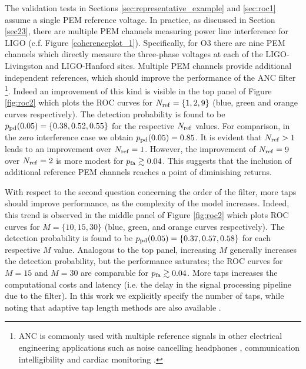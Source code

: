 \documentclass[pra,superscriptaddress,reprint,amsmath,amssymb,nofootinbib]{revtex4-2}
\begin{document}
The validation tests in Sections \ref{sec:representative_example} and \ref{sec:roc1} assume a single PEM reference voltage. In practice, as discussed in Section \ref{sec23}, there are multiple PEM channels measuring power line interference for LIGO (c.f. Figure \ref{coherenceplot_1}). Specifically, for O3 there are nine PEM channels which directly measure the three-phase voltages at each of the LIGO-Livingston and LIGO-Hanford sites. Multiple PEM channels provide additional independent references, which should improve the performance of the ANC filter \footnote{ANC is commonly used with multiple reference signals in other electrical engineering applications such as noise cancelling headphones \citep{10.1121/1.5109394}, communication intelligibility \citep{KUO1996669,doi:10.1177/1084713812456906} and cardiac monitoring \citep{7755741}.}. Indeed an improvement of this kind is visible in the top panel of Figure \ref{fig:roc2} which plots the ROC curves for $N_{\rm ref} = \{ 1,2,9 \}$ (blue, green and orange curves respectively). The detection probability is found to be $p_{\rm pd} (0.05) = \{ 0.38,0.52,0.55 \}$ for the respective $N_{\rm ref}$ values. For comparison, in the zero interference case we obtain $p_{\rm pd}(0.05) = 0.85$. It is evident that $N_{\rm ref} > 1$ leads to an improvement over $N_{\rm ref} = 1$. However, the improvement of $N_{\rm ref} =9$ over $N_{\rm ref} =2$ is more modest for $p_{\rm fa} \gtrsim 0.04$. This suggests that the inclusion of additional reference PEM channels reaches a point of diminishing returns. \newline 


With respect to the second question concerning the order of the filter, more taps should improve performance, as the complexity of the model increases. Indeed, this trend is observed in the middle panel of Figure \ref{fig:roc2}  which plots ROC curves for $M = \{10,15,30\}$ (blue, green, and orange curves respectively). The detection probability is found to be $p_{\rm pd} (0.05) = \{0.37, 0.57, 0.58\}$ for each respective $M$ value. Analogous to the top panel, increasing $M$ generally increases the detection probability, but the performance saturates; the ROC curves for $M=15$ and $M=30$ are comparable for $p_{\rm fa} \gtrsim 0.04$. More taps increases the computational costs and latency (i.e. the delay in the signal processing pipeline due to the filter). In this work we explicitly specify the number of taps, while noting that adaptive tap length methods are also available \citep[e.g.][]{1326385,KAR2017422,KAR2020107043}. \newline 
\end{document}
